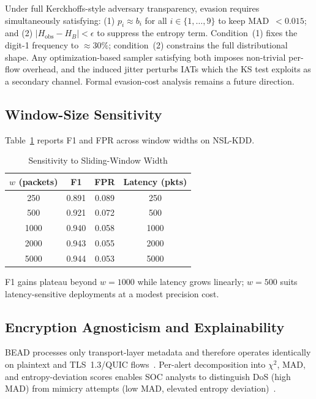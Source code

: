 \documentclass[conference]{IEEEtran}
\begin{document}
Under full Kerckhoffs-style adversary transparency, evasion requires
simultaneously satisfying: (1) $p_i \approx b_i$ for all
$i \in \{1,\ldots,9\}$ to keep MAD~$<0.015$; and (2)
$|H_{\text{obs}} - H_B| < \epsilon$ to suppress the entropy term.
Condition~(1) fixes the digit-1 frequency to $\approx 30\%$; condition~(2)
constrains the full distributional shape. Any optimization-based sampler
satisfying both imposes non-trivial per-flow overhead, and the induced
jitter perturbs IATs which the KS test exploits as a secondary channel.
Formal evasion-cost analysis remains a future direction.

\subsection{Window-Size Sensitivity}

Table~\ref{tab:window} reports F1 and FPR across window widths on NSL-KDD.

\begin{table}[h]
\caption{Sensitivity to Sliding-Window Width}
\label{tab:window}
\centering
\setlength{\tabcolsep}{5pt}
\begin{tabular}{@{}cccc@{}}
\toprule
$w$ (packets) & \textbf{F1} & \textbf{FPR} & \textbf{Latency (pkts)} \\
\midrule
250  & 0.891 & 0.089 & 250  \\
500  & 0.921 & 0.072 & 500  \\
1000 & 0.940 & 0.058 & 1000 \\
2000 & 0.943 & 0.055 & 2000 \\
5000 & 0.944 & 0.053 & 5000 \\
\bottomrule
\end{tabular}
\end{table}

F1 gains plateau beyond $w=1000$ while latency grows linearly; $w=500$
suits latency-sensitive deployments at a modest precision cost.

\subsection{Encryption Agnosticism and Explainability}

BEAD processes only transport-layer metadata and therefore operates
identically on plaintext and TLS~1.3/QUIC flows~\cite{b10}. Per-alert
decomposition into $\chi^2$, MAD, and entropy-deviation scores enables
SOC analysts to distinguish DoS (high MAD) from mimicry attempts
(low MAD, elevated entropy deviation)~\cite{b18}.
\end{document}
